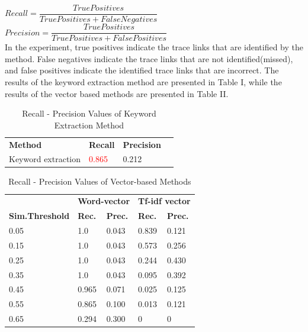 \documentclass[conference]{IEEEtran}
\begin{document}
$Recall = \dfrac{True Positives}{True Positives + False Negatives}$
\\

$Precision = \dfrac{True Positives}{True Positives + False Positives}$
\\

In the experiment, true positives indicate the trace links that are identified by the method. False negatives indicate the trace links that are not identified(missed), and false positives indicate the identified trace links that are incorrect. The results of the keyword extraction method are presented in Table I, while the results of the vector based methods are presented in Table II.


\begin{table}[htb]
\centering
\vspace{1ex}
\begin{tabular}{l l l l}
\textbf{Method} & \textbf{Recall} & \textbf{Precision}\\

Keyword extraction & \textcolor{red}{0.865} & 0.212 \\

\end{tabular}
\caption{Recall - Precision Values of Keyword Extraction Method}
\end{table}

\begin{table}[htb]
\centering
\vspace{1ex}
\begin{tabular}{l l l l l}

\textbf  & \multicolumn{2}{c}{\textbf{Word-vector}} &  \multicolumn{2}{c}{\textbf{Tf-idf vector}}\\
\textbf{Sim.Threshold   } & \textbf{Rec.} &\textbf{Prec.} &  \textbf{Rec.} &\textbf{Prec.}\\

0.05    & 1.0 & 0.043 & 0.839 & 0.121 \\
0.15    & 1.0 & 0.043 & 0.573 & 0.256 \\
0.25    & 1.0 & 0.043 & 0.244 & 0.430 \\
0.35    & 1.0 & 0.043 & 0.095 & 0.392 \\
0.45    & 0.965 & 0.071 & 0.025 & 0.125 \\
0.55    & 0.865 & 0.100 & 0.013 & 0.121 \\
0.65    & 0.294 & 0.300 & 0 & 0 \\

\end{tabular}
\caption{Recall - Precision Values of Vector-based Methods}
\end{table}
\end{document}
